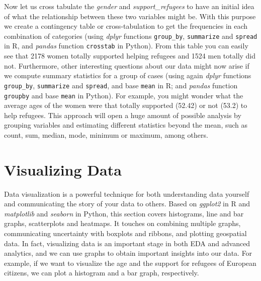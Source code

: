 
Now let us cross tabulate the \textit{gender} and \textit{support\_refugees} to have an initial idea of what the relationship between these two variables might be. With this purpose we create a contingency table or cross-tabulation to get the frequencies in each combination of categories (using \emph{dplyr} functions \texttt{group\_by}, \texttt{summarize} and \texttt{spread} in R, and \emph{pandas} function \texttt{crosstab} in Python). From this table you can easily see that 2178 women totally supported helping refugees and 1524 men totally did not.  Furthermore, other interesting questions about our data might now arise if we compute summary statistics for a group of cases (using again \emph{dplyr} functions \texttt{group\_by}, \texttt{summarize} and \texttt{spread}, and base \texttt{mean} in R; and \emph{pandas} function \texttt{groupby} and base \texttt{mean} in Python). For example, you might wonder what  the average ages of the women were that totally supported (52.42) or not (53.2) to help  refugees.  This approach will open a huge amount of possible analysis by grouping variables and estimating different statistics beyond the mean, such as count, sum, median, mode, minimum or maximum, among others.



%
\section{Visualizing Data}
\label{sec:visualization}


Data visualization is a powerful technique for both understanding data yourself and communicating the story of your data to others. Based on \emph{ggplot2} in R and \emph{matplotlib} and \emph{seaborn} in Python, this section covers histograms, line and bar graphs, scatterplots and heatmaps. It touches on combining multiple graphs, communicating uncertainty with boxplots and ribbons, and plotting geospatial data.  In fact, visualizing data is an important stage in both EDA and advanced analytics, and we can use graphs to obtain important insights into our data. For example, if we want to visualize the age and the support for refugees of European citizens, we can plot a histogram and a bar graph, respectively.

